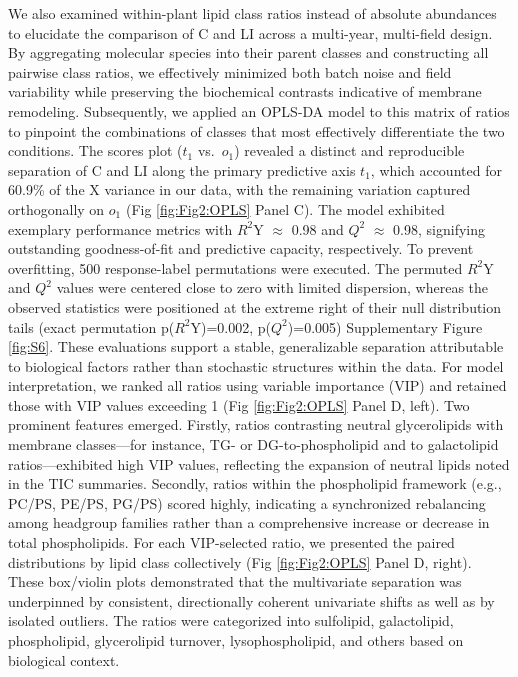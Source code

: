 \documentclass[10pt,letterpaper]{article}
\begin{document}
We also examined within-plant lipid class ratios instead of absolute abundances to elucidate the comparison of C and LI across a multi-year, multi-field design. By aggregating molecular species into their parent classes and constructing all pairwise class ratios, we effectively minimized both batch noise and field variability while preserving the biochemical contrasts indicative of membrane remodeling. Subsequently, we applied an OPLS-DA model to this matrix of ratios to pinpoint the combinations of classes that most effectively differentiate the two conditions. The scores plot ($t_1$ vs.\ $o_1$) revealed a distinct and reproducible separation of C and LI along the primary predictive axis $t_1$, which accounted for 60.9\% of the X variance in our data, with the remaining variation captured orthogonally on $o_1$ (Fig \ref{fig:Fig2:OPLS} Panel C). The model exhibited exemplary performance metrics with $R^2$Y $\approx$ 0.98 and $Q^2$ $\approx$ 0.98, signifying outstanding goodness-of-fit and predictive capacity, respectively. To prevent overfitting, 500 response-label permutations were executed. The permuted $R^2$Y and $Q^2$ values were centered close to zero with limited dispersion, whereas the observed statistics were positioned at the extreme right of their null distribution tails (exact permutation p($R^2$Y)=0.002, p($Q^2$)=0.005) Supplementary Figure \ref{fig:S6}. These evaluations support a stable, generalizable separation attributable to biological factors rather than stochastic structures within the data. For model interpretation, we ranked all ratios using variable importance (VIP) and retained those with VIP values exceeding 1 (Fig \ref{fig:Fig2:OPLS} Panel D, left). Two prominent features emerged. Firstly, ratios contrasting neutral glycerolipids with membrane classes—for instance, TG- or DG-to-phospholipid and to galactolipid ratios—exhibited high VIP values, reflecting the expansion of neutral lipids noted in the TIC summaries. Secondly, ratios within the phospholipid framework (e.g., PC/PS, PE/PS, PG/PS) scored highly, indicating a synchronized rebalancing among headgroup families rather than a comprehensive increase or decrease in total phospholipids. For each VIP-selected ratio, we presented the paired distributions by lipid class collectively (Fig \ref{fig:Fig2:OPLS} Panel D, right). These box/violin plots demonstrated that the multivariate separation was underpinned by consistent, directionally coherent univariate shifts as well as by isolated outliers. The ratios were categorized into sulfolipid, galactolipid, phospholipid, glycerolipid turnover, lysophospholipid, and others based on biological context. 
\end{document}
